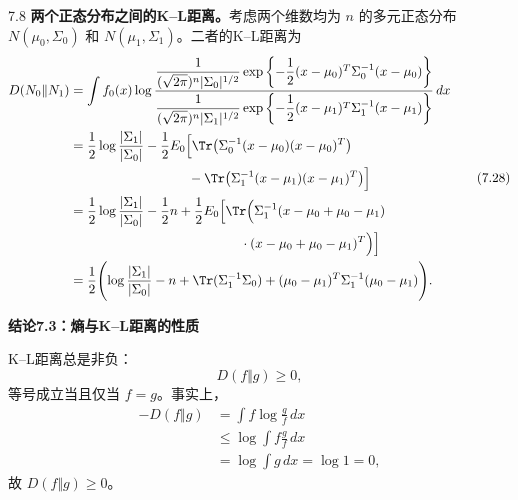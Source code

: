 \begin{bookexample}{7.8}
\textbf{两个正态分布之间的K–L距离。}考虑两个维数均为 $n$ 的多元正态分布 $N(\mu_0,\Sigma_0)$ 和 $N(\mu_1,\Sigma_1)$。二者的K–L距离为
\begin{equation}
\begin{aligned}
D(N_0\Vert N_1)
&=\int f_0(x)\log\frac{
\dfrac1{(\sqrt{2\pi})^n|\Sigma_0|^{1/2}}
\exp\left\{-\dfrac12(x-\mu_0)^T\Sigma_0^{-1}(x-\mu_0)\right\}}
{\dfrac1{(\sqrt{2\pi})^n|\Sigma_1|^{1/2}}
\exp\left\{-\dfrac12(x-\mu_1)^T\Sigma_1^{-1}(x-\mu_1)\right\}}\,dx\\
&=\frac12\log\frac{|\Sigma_1|}{|\Sigma_0|}
-\frac12E_0\Bigl[\Tr\bigl(\Sigma_0^{-1}(x-\mu_0)(x-\mu_0)^T\bigr)\\
&\hspace{9em}-\Tr\bigl(\Sigma_1^{-1}(x-\mu_1)(x-\mu_1)^T\bigr)\Bigr]\\
&=\frac12\log\frac{|\Sigma_1|}{|\Sigma_0|}-\frac12n
+\frac12E_0\Bigl[\Tr\Bigl(\Sigma_1^{-1}(x-\mu_0+\mu_0-\mu_1)\\
&\hspace{13em}\cdot(x-\mu_0+\mu_0-\mu_1)^T\Bigr)\Bigr]\\
&=\frac12\Biggl(\log\frac{|\Sigma_1|}{|\Sigma_0|}-n+\Tr(\Sigma_1^{-1}\Sigma_0)
+(\mu_0-\mu_1)^T\Sigma_1^{-1}(\mu_0-\mu_1)\Biggr).
\end{aligned}
\tag{7.28}
\end{equation}
\end{bookexample}

\par\medskip{}\noindent\textbf{结论7.3：熵与K–L距离的性质}\par
K–L距离总是非负：
\begin{equation}
D(f\Vert g)\ge0,
\tag{7.29}
\end{equation}
等号成立当且仅当 $f=g$。事实上，
\[
\begin{aligned}
-D(f\Vert g)&=\int f\log\frac gf\,dx\\
&\le\log\int f\frac gf\,dx\\
&=\log\int g\,dx=\log1=0,
\end{aligned}
\]
故 $D(f\Vert g)\ge0$。
